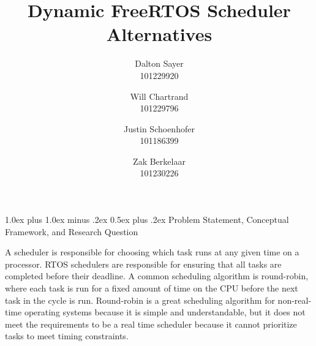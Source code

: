 \documentclass[transmag]{IEEEtran}
\makeatletter
\renewcommand{\section}{\@startsection{section}{1}{\z@}%
  {1.0ex plus 1.0ex minus .2ex}%
  {0.5ex plus .2ex}%
  {\normalfont\large\bfseries}}
\makeatother
\begin{document}
\title{
    \textbf{Dynamic FreeRTOS Scheduler Alternatives } 
}

\author{
  {\Large Dalton Sayer}  \\ 101229920 \\
  \and
  {\Large Will Chartrand} \\ 101229796 \\
  \and
  {\Large Justin Schoenhofer} \\ 101186399 \\
  \and
  {\Large Zak Berkelaar} \\ 101230226 \\
}


\maketitle

\IEEEdisplaynontitleabstractindextext



\setlength{\parskip}{6pt}
\setlength{\parindent}{0.5cm}

 

\vspace{0.5em}

\section{Problem Statement, Conceptual Framework, and Research Question}

A scheduler is responsible for choosing which task runs at any given time on a processor. RTOS schedulers are responsible for ensuring that all tasks are completed before their deadline. A common scheduling algorithm is round-robin, where each task is run for a fixed amount of time on the CPU before the next task in the cycle is run. Round-robin is a great scheduling algorithm for non-real-time operating systems because it is simple and understandable, but it does not meet the requirements to be a real time scheduler because it cannot prioritize tasks to meet timing constraints.  
\end{document}
